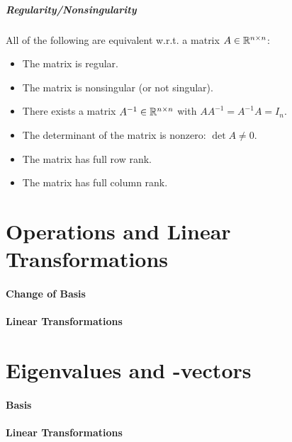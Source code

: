 			\subparagraph{Regularity/Nonsingularity}
				All of the following are equivalent w.r.t. a matrix \( A \in \mathbb{R}^{n \times n} \):
				\begin{itemize}
					\item The matrix is regular.
					\item The matrix is nonsingular (or not singular).
					\item There exists a matrix \( A^{-1} \in \mathbb{R}^{n \times n} \) with \( AA^{-1} = A^{-1}A = I_n \).
					\item The determinant of the matrix is nonzero: \( \det A \neq 0 \).
					\item The matrix has full row rank.
					\item The matrix has full column rank.
				\end{itemize}

	\section{Operations and Linear Transformations} %

		\paragraph{Change of Basis} %

		\paragraph{Linear Transformations} %

	\section{Eigenvalues and -vectors} %

		\paragraph{Basis} %

		\paragraph{Linear Transformations} %
	
